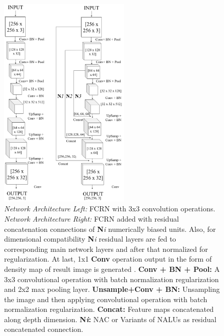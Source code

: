 \documentclass[runningheads]{llncs}
\begin{document}
\begin{figure}[!h]
\centering
\includegraphics[width=0.55\textwidth]{fcrn-abstract.png}
\caption{\textit{Network Architecture Left: }FCRN with 3x3 convolution operations. \textit{Network Architecture Right: } FCRN added with residual concatenation connections of \textbf{N}\textit{i} numerically biased units. Also, for dimensional compatibility \textbf{N}\textit{i} residual layers are fed to corresponding main network layers and after that normalized for regularization. At last, 1x1 \textbf{Conv} operation output in the form of density map of result image is generated .\newline
\textbf{Conv + BN + Pool: }A 3x3 convolutional operation with batch normalization regularization and  2x2 max pooling layer.\newline
\textbf{Unsample+Conv + BN: }Unsampling the image and then applying convolutional operation with batch normalization regularization.\newline
\textbf{Concat: }Feature maps concatenated along depth dimension.\newline
\textbf{N\textit{i}: }NAC or Variants of NALUs as residual concatenated connection.
}
\label{fig8}
\end{figure}
\end{document}
